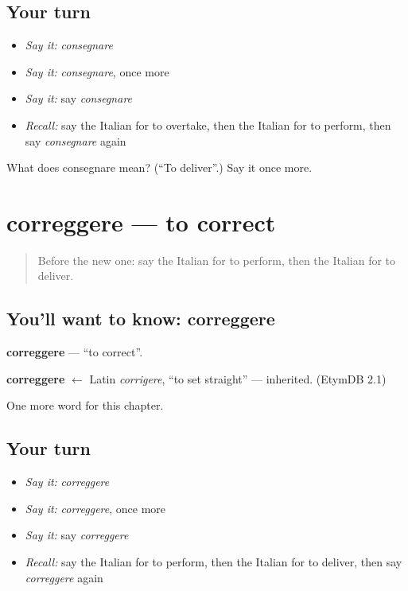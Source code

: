 \subsection*{Your turn}
\begin{itemize}
\raggedright
  \item \emph{Say it:} \emph{consegnare}
  \item \emph{Say it:} \emph{consegnare}, once more
  \item \emph{Say it:} say \emph{consegnare}
  \item \emph{Recall:} say the Italian for to overtake, then the Italian for to perform, then say \emph{consegnare} again
\end{itemize}

\begin{tcolorbox}[breakable,colback=teal!4,colframe=teal!35!black,title={Before you move on}]
What does consegnare mean? (\textquotedblleft{}To deliver\textquotedblright{}.) Say it once more.
\end{tcolorbox}
\section[correggere]{correggere — to correct}

\label{lesson:IT-C241-correggere}



\begin{quote}
Before the new one: say the Italian for to perform, then the Italian for to deliver.
\end{quote}

\subsection*{You'll want to know: correggere}
\textbf{correggere} — \textquotedblleft{}to correct\textquotedblright{}.

\begin{cousinweb}
\textbf{correggere} $\leftarrow$ Latin \emph{corrigere}, \textquotedblleft{}to set straight\textquotedblright{} — inherited. (EtymDB 2.1)
\end{cousinweb}

\begin{grammarlens}[title={What you've built}]
One more word for this chapter.
\end{grammarlens}

\subsection*{Your turn}
\begin{itemize}
\raggedright
  \item \emph{Say it:} \emph{correggere}
  \item \emph{Say it:} \emph{correggere}, once more
  \item \emph{Say it:} say \emph{correggere}
  \item \emph{Recall:} say the Italian for to perform, then the Italian for to deliver, then say \emph{correggere} again
\end{itemize}

